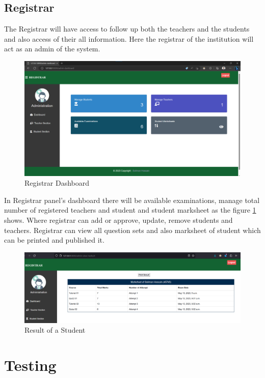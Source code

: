 \subsection{Registrar}
The Registrar will have access to follow up both the teachers and the students and also access of their all information. Here the registrar of the institution will act as an admin of the system.
\begin{figure}[H]
    \centering
    \includegraphics[scale=.36]{img/admin.png}
    \caption{Registrar Dashboard}
    \label{fig:admin}
\end{figure}

 
 In Registrar panel’s dashboard there will be available examinations, manage total number of registered teachers and student and student marksheet as the figure \ref{fig:admin} shows. Where registrar can add or approve, update, remove students and teachers.
Registrar can view all question sets and also marksheet of student which can be printed and published it.
\begin{figure}[H]
    \centering
    \includegraphics[scale=.36]{img/result.png}
    \caption{Result of a Student}
    \label{fig:result}
\end{figure}



\section{Testing}

